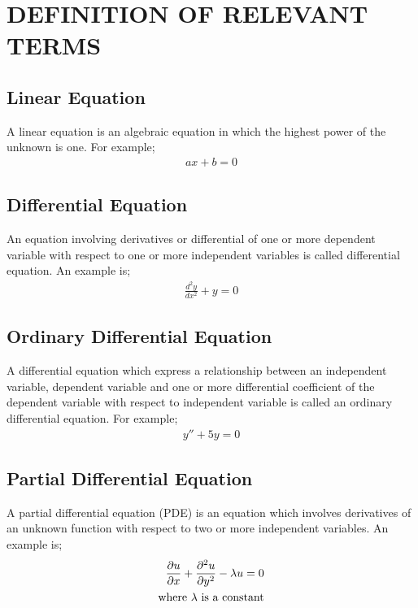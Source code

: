 \documentclass[11pt]{report}
\newcommand{\dprime}{''}
\begin{document}
	\section{DEFINITION OF RELEVANT TERMS}
	\subsection{Linear Equation}
	A linear equation is an algebraic equation in which the highest power of the unknown is one. For example;
	\begin{eqnarray}
		ax+b=0\label{eq:3_3}
	\end{eqnarray}
	
	\subsection{Differential Equation}
	An equation involving derivatives or differential of one or more dependent variable with respect to one or more independent variables is called differential equation. An example is;
	\begin{eqnarray}
		\frac{d^2y}{dx^2} + y = 0\label{eq:3_4}
	\end{eqnarray}
	
	\subsection{Ordinary Differential Equation}
	A differential equation which express a relationship between an independent variable, dependent variable and one or more differential coefficient of the dependent variable with respect to independent variable is called an ordinary differential equation. For example;
	\begin{eqnarray}
		y\dprime + 5y = 0 \label{eq:3_5}
	\end{eqnarray}
	
	\subsection{Partial Differential Equation}
	A partial differential equation (PDE) is an equation which involves derivatives of an unknown function with respect to two or more independent variables. An example is;
	\begin{eqnarray}
		\frac{\partial u}{\partial x} + \frac{\partial^2u}{\partial y^2} - \lambda u = 0\label{eq:3_6}\\
		\text{where }\lambda \text{ is a constant}\notag
	\end{eqnarray}
\end{document}
